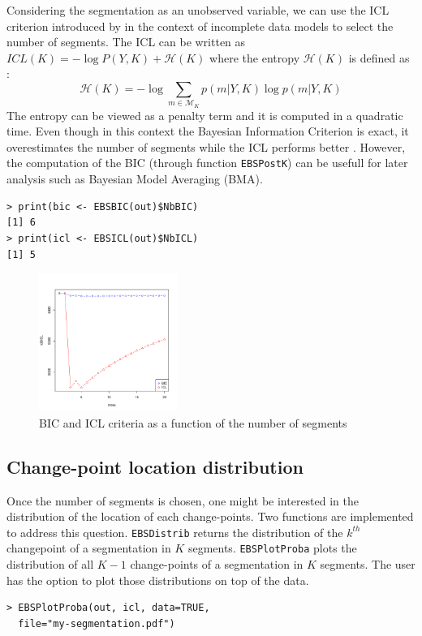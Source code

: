 \documentclass{bioinfo}
\begin{document}
\begin{methods}
Considering the segmentation as an unobserved variable, we can use the ICL criterion introduced by \cite{biernacki_assessingmixture_2000} in the context of incomplete data models to select the number of segments. 
The ICL can be written as $ICL(K) = -\log P(Y,K) + \mathcal{H}(K) \label{ICL}$ where
the entropy $\mathcal{H}(K)$ is defined as :
\begin{equation}
  \mathcal{H}(K)=-\log \sum_{m\in \mathcal{M}_K} p(m|Y,K) \log p(m|Y,K)
\end{equation}
The entropy can be viewed as a penalty term and it is computed in a quadratic time. 
 Even though in this context the Bayesian Information Criterion is exact, it overestimates the number of segments while the ICL performs better \citep{rigaill_exact_2011}. However, the computation of the BIC (through function \texttt{EBSPostK}) can be usefull for later analysis such as Bayesian Model Averaging (BMA).
\begin{verbatim}
> print(bic <- EBSBIC(out)$NbBIC)
[1] 6
> print(icl <- EBSICL(out)$NbICL)
[1] 5

\end{verbatim}


\begin{figure}[!h]%
\centerline{\includegraphics[width=4.5cm]{icl-bic.pdf}}
\caption{BIC and ICL criteria as a function of the number of segments} \label{fig:01}
\end{figure}






\subsection{Change-point location distribution}

Once the number of segments is chosen, one might be interested in the distribution of the location of each change-points. Two functions are implemented to address this question. \texttt{EBSDistrib} returns the distribution of the $k^{th}$ changepoint of a segmentation in $K$ segments. \texttt{EBSPlotProba} plots the distribution of all $K\!-\!1$ change-points of a segmentation in $K$ segments. The user has the option to plot those distributions on top of the data. 
\begin{verbatim}
> EBSPlotProba(out, icl, data=TRUE,
  file="my-segmentation.pdf")
\end{verbatim}


\end{methods}
\end{document}
